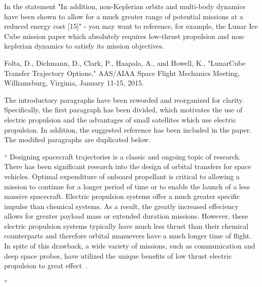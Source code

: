 \documentclass[11pt]{article}
\newenvironment{correction}{\begin{list}{}{\setlength{\leftmargin}{1cm}\setlength{\rightmargin}{1cm}}\vspace{\parsep}\item[]``}{''\end{list}}
\begin{document}
\begin{enumerate}
    \item
        \begin{itshape}
            In the statement "In addition, non-Keplerian orbits and multi-body dynamics have been shown to allow for a much greater range of potential
            missions at a reduced energy cost [15]" - you may want to reference, for example, the Lunar Ice Cube mission paper which absolutely requires low-thrust propulsion and non-keplerian dynamics to satisfy its mission objectives.

            Folta, D., Dichmann, D., Clark, P., Haapala, A., and Howell, K., "LunarCube Transfer Trajectory Options," AAS/AIAA Space Flight Mechanics Meeting, Williamsburg, Virginia, January 11-15, 2015.
        \end{itshape}

        The introductory paragraphs have been reworded and reorganized for clarity. 
        Specifically, the first paragraph has been divided, which motivates the use of electric propulsion and the advantages of small satellites which use electric propulsion.
        In addition, the suggested reference has been included in the paper.
        The modified paragraphs are duplicated below.

        \begin{correction}
            Designing spacecraft trajectories is a classic and ongoing topic of research.
            There has been significant research into the design of orbital transfers for space vehicles.
            Optimal expenditure of onboard propellant is critical to allowing a mission to continue for a longer period of time or to enable the launch of a less massive spacecraft.
            Electric propulsion systems offer a much greater specific impulse than chemical systems.
            As a result, the greatly increased effeciency allows for greater payload mass or extended duration missions.
            However, these electric propulsion systems typically have much less thrust than their chemical counterparts and therefore orbital manuevers have a much longer time of flight.
            In spite of this drawback, a wide variety of missions, such as communication and deep space probes, have utilized the unique benefits of low thrust electric propulsion to great effect~\cite{choueiri2009}.


\end{correction}
\end{enumerate}
\end{document}

